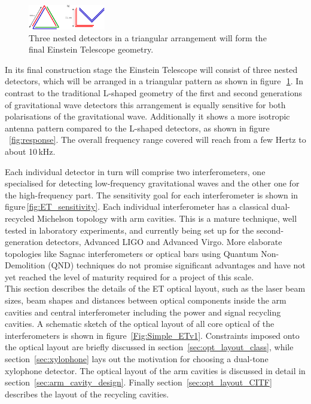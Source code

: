 
\FloatBarrier
\label{sec:optlayout}


\begin{figure}
	\centering
		\includegraphics[width=0.3\textwidth]{Detector/Optics/Images//NestedDetectors.pdf}
	\caption{Three nested detectors in a triangular arrangement will 
	form the final Einstein Telescope geometry.}
	\label{fig:NestedDetectors}
\end{figure}
In its final construction stage the Einstein Telescope will consist of three nested detectors, which will be arranged in a triangular pattern as shown in figure\,~\ref{fig:NestedDetectors}. In contrast to the traditional L-shaped geometry of the first and second generations of gravitational wave detectors this arrangement is equally sensitive for both polarisations of the gravitational wave. Additionally it shows a more isotropic antenna pattern compared to the L-shaped detectors, as shown in figure\,~\ref{fig:response}. The overall frequency range covered will reach from a few Hertz to about 10\,kHz.

Each individual detector in turn will comprise two interferometers, one specialised for detecting low-frequency gravitational waves and the other one for the high-frequency part. The sensitivity goal for each interferometer is shown in figure\,\ref{fig:ET_sensitivity}. %
Each individual interferometer has a classical dual-recycled Michelson topology with arm cavities. This is a mature technique, well tested in laboratory experiments, and currently being set up for the second-generation detectors, Advanced LIGO and Advanced Virgo. More elaborate topologies like Sagnac interferometers or optical bars using Quantum Non-Demolition (QND) techniques do not promise significant advantages and have not yet reached the level of  maturity required for a project of this scale.\\



This section describes the details of the ET optical layout, such as the laser beam sizes, beam shapes and distances between optical components inside the arm cavities and central interferometer including the power and signal recycling cavities. A schematic sketch of the optical layout of all core optical of the interferometers is shown in figure~\ref{Fig:Simple_ETv1}.
Constraints imposed onto the optical layout are briefly discussed in section~\ref{sec:opt_layout_class}, while  section~\ref{sec:xylophone} lays out the motivation for choosing a dual-tone xylophone detector. The optical layout of the arm cavities is discussed in detail in section~\ref{sec:arm_cavity_design}. Finally section~\ref{sec:opt_layout_CITF} describes the layout of the recycling cavities. 

